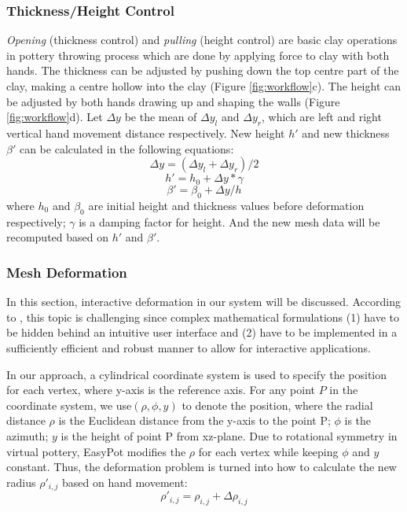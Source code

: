 \documentclass{svjour3}                     %
\begin{document}
\subsubsection{Thickness/Height Control}
\label{sec:4.2.2}
\textit{Opening} (thickness control) and \textit{pulling} (height control) are basic clay operations in pottery throwing process which are done by applying force to clay with both hands. The thickness can be adjusted by pushing down the top centre part of the clay, making a centre hollow into the clay (Figure \ref{fig:workflow}c). The height can be adjusted by both hands drawing up and shaping the walls (Figure \ref{fig:workflow}d).
Let $\Delta y$ be the mean of $\Delta y_{l}$ and $\Delta y_{r}$, which are left and right vertical hand movement distance respectively. New height $h'$ and new thickness $\beta'$ can be calculated in the following equations:
\begin{equation}
\Delta y = (\Delta y_{l} + \Delta y_{r})/2
\end{equation}
\begin{equation}
h' = h_{0} + \Delta y * \gamma
\end{equation}
\begin{equation}
\beta' = \beta_{0} + \Delta y/ h
\end{equation}
where $h_{0}$ and $\beta_{0}$ are initial height and thickness values before deformation respectively; $\gamma$ is a damping factor for height. And the new mesh data will be recomputed based on $h'$ and $\beta'$.

\subsubsection{Mesh Deformation}
\label{sec:4.2.3}
In this section, interactive deformation in our system will be discussed. According to \cite{botsch2010polygon}, this topic is challenging since complex mathematical formulations (1) have to be hidden behind an intuitive user interface and (2) have to be implemented in a sufficiently efficient and robust manner to allow for interactive applications.

In our approach, a cylindrical coordinate system is used to specify the position for each vertex, where y-axis is the reference axis. For any point $P$ in the coordinate system, we use$(\rho, \phi, y)$ to denote the position, where the radial distance $\rho$ is the Euclidean distance from the y-axis to the point P; $\phi$ is the azimuth; $y$ is the height of point P from xz-plane.
Due to rotational symmetry in virtual pottery, EasyPot modifies the $\rho$ for each vertex while keeping $\phi$ and $y$ constant. Thus, the deformation problem is turned into how to calculate the new radius $\rho'_{i,j}$ based on hand movement:
\begin{equation}
\rho'_{i,j} = \rho_{i,j} + \Delta \rho_{i,j}
\end{equation}
\end{document}
